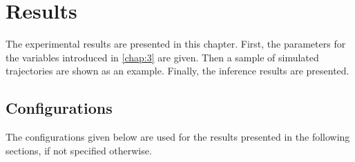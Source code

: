 %
%
\chapter{Results}
\label{chap:4}
The experimental results are presented in this chapter. First, the parameters for the variables introduced in \cref{chap:3} are given. Then a sample of simulated trajectories are shown as an example. Finally, the inference results are presented.

\section{Configurations}
\label{sec:config}
The configurations given below are used for the results presented in the following sections, if not specified otherwise.
